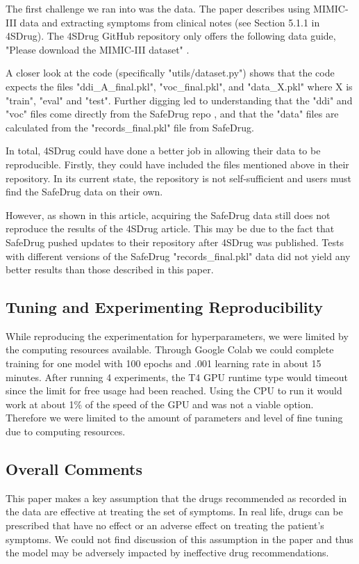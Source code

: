 \documentclass[letterpaper]{article} %
\begin{document}
The first challenge we ran into was the data. The paper describes using MIMIC-III data and extracting symptoms from clinical notes (see Section 5.1.1 in 4SDrug). The 4SDrug GitHub repository only offers the following data guide, "Please download the MIMIC-III dataset" \cite{4sdrug_github}.

A closer look at the code (specifically "utils/dataset.py") shows that the code expects the files "ddi\_A\_final.pkl", "voc\_final.pkl", and "data\_X.pkl" where X is "train", "eval" and "test". Further digging led to understanding that the "ddi" and "voc" files come directly from the SafeDrug repo \cite{safedrug_github}, and that the "data" files are calculated from the "records\_final.pkl" file from SafeDrug. 

In total, 4SDrug could have done a better job in allowing their data to be reproducible. Firstly, they could have included the files mentioned above in their repository. In its current state, the repository is not self-sufficient and users must find the SafeDrug data on their own.

However, as shown in this article, acquiring the SafeDrug data still does not reproduce the results of the 4SDrug article. This may be due to the fact that SafeDrug pushed updates to their repository after 4SDrug was published. Tests with different versions of the SafeDrug "records\_final.pkl" data did not yield any better results than those described in this paper.

\subsection{Tuning and Experimenting Reproducibility}
While reproducing the experimentation for hyperparameters, we were limited by the computing resources available.  Through Google Colab we could complete training for one model with 100 epochs and .001 learning rate in about 15 minutes.  After running 4 experiments, the T4 GPU runtime type would timeout since the limit for free usage had been reached.  Using the CPU to run it would work at about 1\% of the speed of the GPU and was not a viable option.  Therefore we were limited to the amount of parameters and level of fine tuning due to computing resources.    


\subsection{Overall Comments}

This paper makes a key assumption that the drugs recommended as recorded in the data are effective at treating the set of symptoms. In real life, drugs can be prescribed that have no effect or an adverse effect on treating the patient's symptoms. We could not find discussion of this assumption in the paper and thus the model may be adversely impacted by ineffective drug recommendations.
\end{document}
